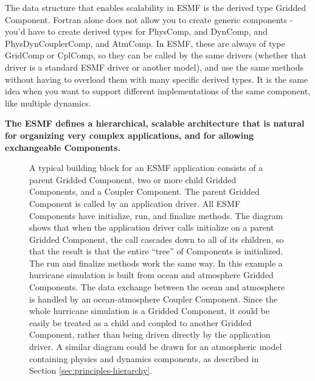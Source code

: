 The data structure that enables scalability in ESMF is the
derived type Gridded Component.  Fortran alone does not allow you to create
generic components - you'd have to create derived types for
PhysComp, and DynComp, and PhysDynCouplerComp, and AtmComp.  In 
ESMF, these are always of type GridComp or CplComp, so they 
can be called by the same drivers (whether that driver is a 
standard ESMF driver or another model), and use the same methods
without having to overload them with many specific derived 
types.  It is the same idea when you want to support different 
implementations of the same component, like multiple dynamics.

{\bf The ESMF defines a hierarchical, scalable architecture 
that is natural for organizing very complex applications, and
for allowing exchangeable Components.}

\begin{figure}
\caption{A typical building block for an ESMF application consists 
of a parent Gridded Component, two or more child Gridded Components, and 
a Coupler Component.  The parent Gridded Component is called by an 
application driver.  All ESMF Components have initialize, run, and 
finalize methods.  The diagram shows that when the application driver calls 
initialize on a parent Gridded Component, the call cascades down to
all of its children, so that the result is that the entire ``tree''
of Components is initialized.  The run and finalize methods work the
same way.  In this example a hurricane simulation is built 
from ocean and atmosphere Gridded Components.  The data exchange between 
the ocean and atmosphere is handled by an ocean-atmosphere Coupler Component.  
Since the whole hurricane simulation is a Gridded Component,
it could be easily be treated as a child and coupled to another
Gridded Component, rather than being driven directly by the application 
driver.  A similar diagram could be drawn for an atmospheric model containing
physics and dynamics components, as described in Section 
\ref{sec:principles-hierarchy}.}
\label{fig:appunit}
\end{figure}

